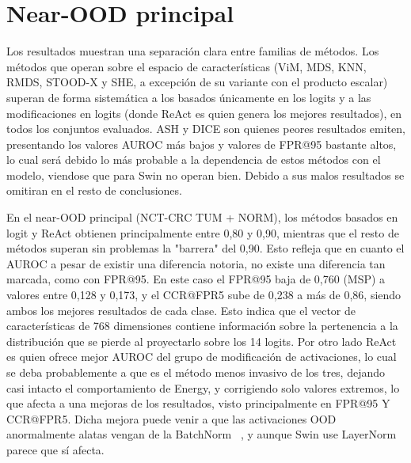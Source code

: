 
\section{Near-OOD principal}\label{sec:ood-near}

Los resultados muestran una separación clara entre familias de métodos. Los métodos que operan sobre el espacio de características (ViM, MDS, KNN, RMDS, STOOD-X y SHE, a excepción de su variante con el producto escalar) superan de forma sistemática a los basados únicamente en los logits y a las modificaciones en logits (donde ReAct es quien genera los mejores resultados), en todos los conjuntos evaluados.
ASH y DICE son quienes peores resultados emiten, presentando los valores AUROC más bajos y valores de FPR@95 bastante altos, lo cual será debido lo más probable 
a la dependencia de estos métodos con el modelo, viendose que para Swin no operan bien. Debido a sus malos resultados se omitiran en el resto de conclusiones. 

En el near-OOD principal (NCT-CRC TUM + NORM), los métodos basados en logit y ReAct obtienen principalmente entre
0,80 y 0,90, mientras que el resto de métodos superan sin problemas la "barrera" del 0,90. Esto refleja que en cuanto el AUROC a pesar de existir una diferencia notoria, no existe una
diferencia tan marcada,  como con FPR@95. En este caso el FPR@95 baja de 0,760 (MSP) a valores entre 0,128 y 0,173, y el CCR@FPR5 sube de 0,238 a más de 0,86, siendo ambos los mejores resultados de cada clase. Esto indica que el vector de características de 768 dimensiones contiene información sobre la pertenencia a la distribución que se pierde al proyectarlo sobre los 14 logits. Por otro lado ReAct es quien ofrece mejor AUROC del grupo 
de modificación de activaciones, lo cual se deba probablemente a que es el método menos invasivo de los tres, dejando casi intacto el comportamiento de Energy, y corrigiendo solo 
valores extremos, lo que afecta a una mejoras de los resultados, visto principalmente en FPR@95 Y CCR@FPR5. Dicha mejora puede venir a que las activaciones OOD anormalmente
alatas vengan de la BatchNorm ~\cite{openood15}, y aunque Swin use LayerNorm parece que sí afecta. 


